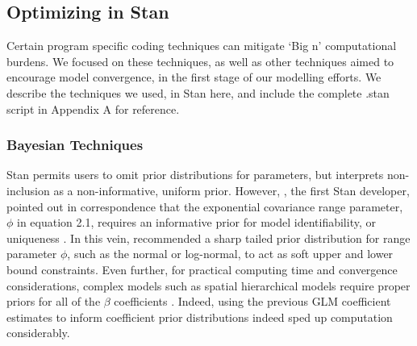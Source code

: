 
\subsection{Optimizing in Stan} %
Certain program specific coding techniques can mitigate `Big n' computational burdens. We focused on these techniques, as well as other techniques aimed to encourage model convergence, in the first stage of our modelling efforts. We describe the techniques we used, in Stan here, and include the complete .stan script in Appendix A for reference. 

\subsubsection{Bayesian Techniques} %

Stan permits users to omit prior distributions for parameters, but interprets non-inclusion as a non-informative, uniform prior. However, \cite{Gelman}, the first Stan developer, pointed out in correspondence that the exponential covariance range parameter, $\phi$ in equation 2.1, requires an informative prior for model identifiability, or uniqueness \citep{Gelman2014}. In this vein, \cite{Trangucci} recommended a sharp tailed prior distribution for range parameter $\phi$, such as the normal or log-normal, to act as soft upper and lower bound constraints. Even further, for practical computing time and convergence considerations, complex models such as spatial hierarchical models require proper priors for all of the $\beta$ coefficients \citep{Trangucci}. Indeed, using the previous GLM coefficient estimates to inform coefficient prior distributions indeed sped up computation considerably.

